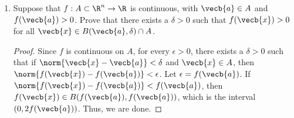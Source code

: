 \documentclass[a5paper]{article}
\theoremstyle{definition}%
\newtheorem*{example*}{Example}
\numberwithin{exercise}{section}
\theoremstyle{remark}%
\begin{document}
\begin{enumerate}
\begin{example*}
\begin{proof}
Now, under $f$, every ordered pair maps either to itself, or to a corresponding ordered pair in the first quadrant (or on its boundary); so the image of $U$ is $f(U)=U\cap I$, where $I$ denotes the closure of the first quadrant.



The set $f(U)$ is not open; since the origin $\vecb{0} \in f(U)$, but every $B(\vecb{0},r)$ contains points in every quadrant, so no open ball $B(\vecb{0},r)$ is a subset of $f(U)$.



Therefore, (2) fails. Thus, (1) $\centernot\implies$ (2). 
\end{proof}
\end{example*}

\item Suppose that  $f:A\subset \R^n\to \R$ is continuous, with $\vecb{a}\in A$ and $f(\vecb{a})>0$. Prove that there exists a $\delta>0$ such that $f(\vecb{x})>0$ for all $\vecb{x}\in B(\vecb{a},\delta)\cap A$. 
\begin{proof}
Since $f$ is continuous on $A$, for every $\epsilon>0$, there exists a $\delta>0$ such that if $\norm{\vecb{x}-\vecb{a}}<\delta$ and $\vecb{x}\in A$, then $\norm{f(\vecb{x})-f(\vecb{a})}<\epsilon$. Let $\epsilon=f(\vecb{a})$. If $\norm{f(\vecb{x})-f(\vecb{a})}<f(\vecb{a})$, then $f(\vecb{x})\in B(f(\vecb{a}), f(\vecb{a}))$, which is the interval $(0, 2f(\vecb{a}))$. Thus, we are done.
\end{proof}


\end{enumerate}
\end{document}
